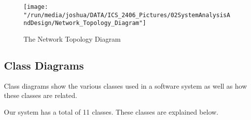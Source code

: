 \documentclass[12pt,svgnames,smaller]{article} %
\begin{document}
	\begin{figure}
		\centering
		\texttt{[image: "/run/media/joshua/DATA/ICS\_2406\_Pictures/02SystemAnalysisAndDesign/Network\_Topology\_Diagram"]}
		\caption{The Network Topology Diagram}
		\label{fig:SystemAnalysisandDesign-Network_Topology_Diagram}
	\end{figure}
	
		
	\subsection{Class Diagrams}
	
	Class diagrams show the various classes used in a software system as well as how these classes are related.
	
	Our system has a total of 11 classes. These classes are explained below.
	
\end{document}
